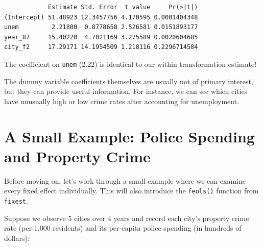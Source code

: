 \documentclass[
  letterpaper,
  DIV=11,
  numbers=noendperiod]{scrreprt}
\begin{document}
\begin{verbatim}
            Estimate Std. Error  t value     Pr(>|t|)
(Intercept) 51.48923 12.3457756 4.170595 0.0001404348
unem         2.21800  0.8778658 2.526581 0.0151893177
year_87     15.40220  4.7021169 3.275589 0.0020604685
city_f2     17.29171 14.1954509 1.218116 0.2296714584
\end{verbatim}

The coefficient on \texttt{unem} (2.22) is identical to our within
transformation estimate!

The dummy variable coefficients themselves are usually not of primary
interest, but they can provide useful information. For instance, we can
see which cities have unusually high or low crime rates after accounting
for unemployment.

\section{A Small Example: Police Spending and Property
Crime}\label{a-small-example-police-spending-and-property-crime}

Before moving on, let's work through a small example where we can
examine every fixed effect individually. This will also introduce the
\texttt{feols()} function from \texttt{fixest}.

Suppose we observe 5 cities over 4 years and record each city's property
crime rate (per 1,000 residents) and its per-capita police spending (in
hundreds of dollars):
\end{document}
